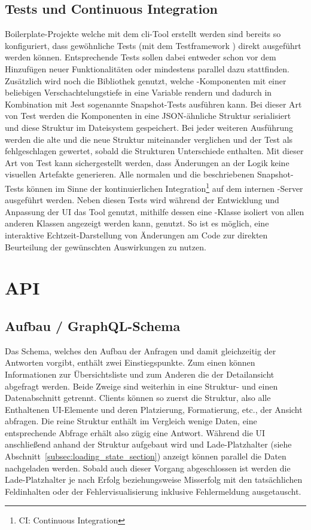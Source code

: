 \subsection{Tests und Continuous Integration}\label{subsec:test_ci_concept}
Boilerplate-Projekte welche mit dem \gls{cli}-Tool  erstellt werden sind bereits so konfiguriert, dass gewöhnliche Tests (mit dem Testframework ) direkt ausgeführt werden können. Entsprechende Tests sollen dabei entweder schon vor dem Hinzufügen neuer Funktionalitäten oder mindestens parallel dazu stattfinden. Zusätzlich wird noch die Bibliothek  genutzt, welche -Komponenten mit einer beliebigen Verschachtelungstiefe in eine Variable rendern und dadurch in Kombination mit Jest sogenannte Snapshot-Tests ausführen kann. Bei dieser Art von Test werden die Komponenten in eine JSON-ähnliche Struktur serialisiert und diese Struktur im Dateisystem gespeichert. Bei jeder weiteren Ausführung werden die alte und die neue Struktur miteinander verglichen und der Test als fehlgeschlagen gewertet, sobald die Strukturen Unterschiede enthalten. Mit dieser Art von Test kann sichergestellt werden, dass Änderungen an der Logik keine visuellen Artefakte generieren. Alle normalen und die beschriebenen Snapshot-Tests können im Sinne der kontinuierlichen Integration\footnote{CI: Continuous Integration} auf dem internen -Server ausgeführt werden.
Neben diesen Tests wird während der Entwicklung und Anpassung der UI das Tool  genutzt, mithilfe dessen eine -Klasse isoliert von allen anderen Klassen angezeigt werden kann, genutzt. So ist es möglich, eine interaktive Echtzeit-Darstellung von Änderungen am Code zur direkten Beurteilung der gewünschten Auswirkungen zu nutzen.

\section{API}

\subsection{Aufbau / GraphQL-Schema}\label{subsec:grapql_schema}
Das Schema, welches den Aufbau der Anfragen und damit gleichzeitig der Antworten vorgibt, enthält zwei Einstiegspunkte. Zum einen können Informationen zur Übersichtsliste und zum Anderen die der Detailansicht abgefragt werden. Beide Zweige sind weiterhin in eine Struktur- und einen Datenabschnitt getrennt. Clients können so zuerst die Struktur, also alle Enthaltenen UI-Elemente und deren Platzierung, Formatierung, etc., der Ansicht abfragen. Die reine Struktur enthält im Vergleich wenige Daten, eine entsprechende Abfrage erhält also zügig eine Antwort. Während die UI anschließend anhand der Struktur aufgebaut wird und Lade-Platzhalter (siehe Abschnitt~\ref{subsec:loading_state_section}) anzeigt können parallel die Daten nachgeladen werden. Sobald auch dieser Vorgang abgeschlossen ist werden die Lade-Platzhalter je nach Erfolg beziehungsweise Misserfolg mit den tatsächlichen Feldinhalten oder der Fehlervisualisierung inklusive Fehlermeldung ausgetauscht.

